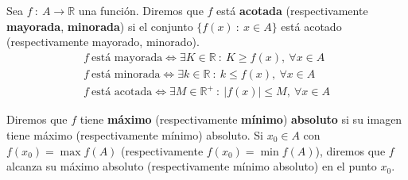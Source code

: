 \begin{definicion}
    Sea $f ~:~ A \longrightarrow \mathbb{R}$ una función. Diremos que $f$ está \textbf{acotada} (respectivamente \textbf{mayorada}, \textbf{minorada}) si el conjunto $\{f(x) ~:~ x \in A\}$ está acotado (respectivamente mayorado, minorado).
    \begin{gather*}
        f ~ \text{está mayorada} \Longleftrightarrow \exists K \in \mathbb{R} ~:~ K \geq f(x), ~ \forall x \in A \\
        f ~ \text{está minorada} \Longleftrightarrow \exists k \in \mathbb{R} ~:~ k \leq f(x), ~ \forall x \in A \\
        f ~ \text{está acotada} \Longleftrightarrow \exists M \in \mathbb{R^+} ~:~ |f(x)| \leq M, ~ \forall x \in A
    \end{gather*}
    
    Diremos que $f$ tiene \textbf{máximo} (respectivamente \textbf{mínimo}) \textbf{absoluto} si su imagen tiene máximo (respectivamente mínimo) absoluto. Si $x_0 \in A$ con $f(x_0) = \max f(A)$ (respectivamente $f(x_0) = \min f(A)$), diremos que $f$ alcanza su máximo absoluto (respectivamente mínimo absoluto)
    en el punto $x_0$.
\end{definicion}

